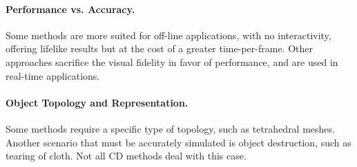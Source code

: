 \paragraph{Performance vs. Accuracy.}

Some methods are more suited for off-line applications, with no interactivity, offering lifelike results but at the cost of a greater time-per-frame. Other approaches sacrifice the visual fidelity in favor of performance, and are used in real-time applications.

\paragraph{Object Topology and Representation.}
Some methods require a specific type of topology, such as tetrahedral meshes. Another scenario that must be accurately simulated is object destruction, such as tearing of cloth. Not all CD methods deal with this case.

